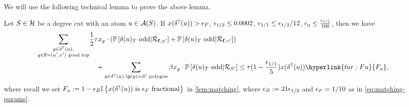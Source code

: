 We will use the following technical lemma to prove the above lemma.
\begin{lemma}
\label{lem:topedge}
Let $S\in\mathcal{H}$ be a degree cut with an atom $u\in{\cal A}(S)$. If $x(\delta ^\uparrow (u)) > {\epsilon}_F$, ${\epsilon}_{1/2}\leq 0.0002$, ${\epsilon}_{1/1}\leq {\epsilon}_{1/2}/12$, ${\epsilon}_\eta \le \frac{{\epsilon}_{1/1}}{100}$, then we have \begin{align}
\label{eq:topred}
	\sum_{\substack{ g\in \delta ^\uparrow (u),\\ g\in \bbf=(u',v') \text{ good top}}} &\frac{1}{2} \tau x_g \cdot  (\P{\delta(u)_T\text{ odd}|\cR_{\bbf,u'}} + \P{\delta(u)_T\text{ odd} | \cR_{\bbf,v'}})\\
&\quad	+\sum_{g\in \delta^\uparrow(u), \p(g)=S'\text{ polygon}} \beta x_g \cdot \P{\delta(u)_T \text{ odd} | \cR_{S'}}
\le \tau(1-\frac{\eps_{1/1}}{5}) x(\delta^\uparrow(u)) \hyperlink{tar:Fu}{F_u},\nonumber
\end{align}
where recall we set $ F_u := 1-{\epsilon}_B {\mathbb{I}}\left\{x(\delta^\uparrow(u))\text{ is ${\epsilon}_F$ fractional}\right\}$ in \cref{lem:matching}, where ${\epsilon}_B := 21 {\epsilon}_{1/2}$ and ${\epsilon}_F = 1/10$ as in \ref{eq:matching-params}.
\end{lemma}

